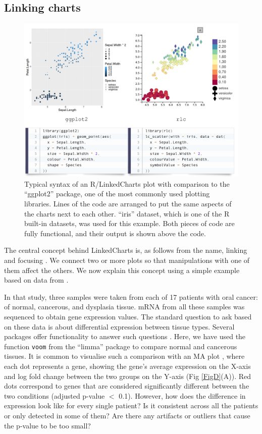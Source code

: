 \documentclass[twocolumn,10pt]{article}
\begin{document}
\subsection{Linking charts}

\begin{figure}[t]
	\includegraphics[width=\textwidth]{FigB/figB.png}
	\caption{Typical syntax of an R/LinkedCharts plot with comparison to the ``ggplot2'' \citep{wickham_2016} package, one of the most commonly used plotting libraries. Lines of the code are arranged to put the same aspects of the charts next to each other. ``iris'' dataset, which is one of the R built-in datasets, was used for this example. Both pieces of code are fully functional, and their output is shown above the code.}
	\label{FigB}
\end{figure}

The central concept behind LinkedCharts is, as follows from the name, linking and focusing \citep{buja_1991}. We connect two or more plots so that manipulations with one of them affect the others. We now explain this concept using a simple example based on data from \citet{conway_2015}.

In that study, three samples were taken from each of 17 patients with oral cancer: of normal, cancerous, and dysplasia tissue. mRNA from all these samples was sequenced to obtain gene expression values. The standard question to ask based on these data is about differential expression between tissue types. Several packages offer functionality to answer such questions  \citep{ritchie_2015, love_2014}. Here, we have used the function \texttt{voom} from the ``limma'' package to compare normal and cancerous tissues. It is common to visualise such a comparison with an MA plot \citep{dudoit_2002}, where each dot represents a gene, showing the gene's average expression on the X-axis and log fold change between the two groups on the Y-axis (Fig \ref{FigD}(A)). Red dots correspond to genes that are considered significantly different between the two conditions (adjusted p-value $<$ 0.1). However, how does the difference in expression look like for every single patient? Is it consistent across all the patients or only detected in some of them? Are there any artifacts or outliers that cause the p-value to be too small?
\end{document}
